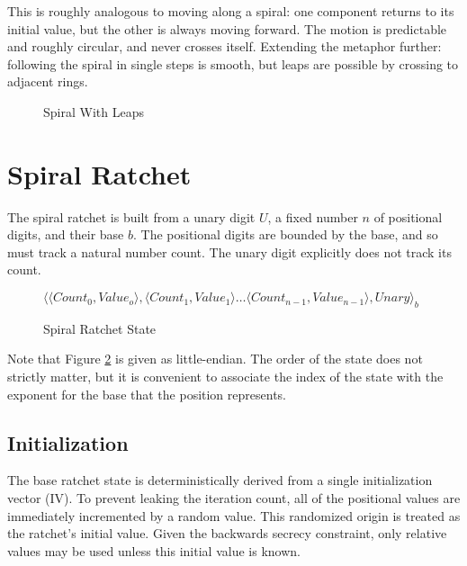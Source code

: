 \documentclass{article}
\begin{document}
	This is roughly analogous to moving along a spiral: one component returns to its initial value, but the other is always moving forward. The motion is predictable and roughly circular, and never crosses itself. Extending the metaphor further: following the spiral in single steps is smooth, but leaps are possible by crossing to adjacent rings.
	
	\begin{figure}[h]
		\centering
		
		
		\caption{Spiral With Leaps}
		\label{spiral-metaphor}
	\end{figure}

	\FloatBarrier
	
	\section{Spiral Ratchet}
	
	The spiral ratchet is built from a unary digit $U$, a fixed number $n$ of positional digits, and their base $b$. The positional digits are bounded by the base, and so must track a natural number count. The unary digit explicitly does not track its count.
	
	\begin{figure}[h]
		\centering
		
		$\langle \langle Count_{0}, Value_{o} \rangle, \langle Count_{1}, Value_{1} \rangle \ldots \langle Count_{n-1}, Value_{n-1} \rangle, Unary \rangle_{b}$
		
		\caption{Spiral Ratchet State}
		\label{fig:state}
	\end{figure}

	Note that Figure \ref{fig:state} is given as little-endian. The order of the state does not strictly matter, but it is convenient to associate the index of the state with the exponent for the base that the position represents.
	
	\subsection{Initialization}
	
	The base ratchet state is deterministically derived from a single initialization vector (IV). To prevent leaking the iteration count, all of the positional values are immediately incremented by a random value. This randomized origin is treated as the ratchet's initial value. Given the backwards secrecy constraint, only relative values may be used unless this initial value is known.
	
\end{document}
